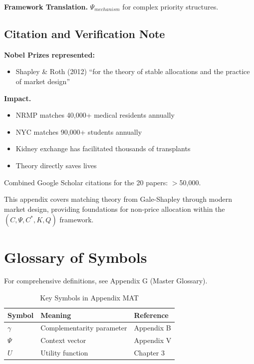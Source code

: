 \textbf{Framework Translation.}
$\Psi_{mechanism}$ for complex priority structures.

\subsection{Citation and Verification Note}

\textbf{Nobel Prizes represented:}
\begin{itemize}
    \item Shapley \& Roth (2012) ``for the theory of stable allocations and 
          the practice of market design''
\end{itemize}

\textbf{Impact.}
\begin{itemize}
    \item NRMP matches 40,000+ medical residents annually
    \item NYC matches 90,000+ students annually
    \item Kidney exchange has facilitated thousands of transplants
    \item Theory directly saves lives
\end{itemize}

Combined Google Scholar citations for the 20 papers: $>$50,000.

This appendix covers matching theory from Gale-Shapley through modern 
market design, providing foundations for non-price allocation within 
the $(C, \Psi, C^*, K, Q)$ framework.




\section{Glossary of Symbols}
\label{sec:mat-glossary}

For comprehensive definitions, see Appendix G (Master Glossary).

\begin{table}[htbp]
\centering
\caption{Key Symbols in Appendix MAT}
\begin{tabular}{lll}
\toprule
\textbf{Symbol} & \textbf{Meaning} & \textbf{Reference} \\
\midrule
$\gamma$ & Complementarity parameter & Appendix B \\
$\Psi$ & Context vector & Appendix V \\
$U$ & Utility function & Chapter 3 \\
\bottomrule
\end{tabular}
\end{table}



